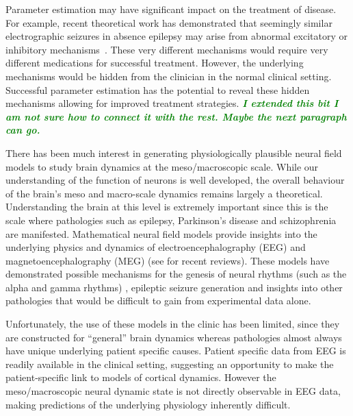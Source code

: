 \documentclass[twocolumn,11pt,a4paper]{article}		%
\newcommand{\omg}[1]{\textsf{\emph{\textbf{\textcolor{green}{#1}}}}}
\begin{document}
Parameter estimation may have significant impact on the treatment of disease. For example, recent theoretical work has demonstrated that seemingly similar electrographic seizures in absence epilepsy may arise from abnormal excitatory or inhibitory mechanisms~\cite{marten2009derivation}. These very different mechanisms would require very different medications for successful treatment. However, the underlying mechanisms would be hidden from the clinician in the normal clinical setting. Successful parameter estimation has the potential to reveal these hidden mechanisms allowing for improved treatment strategies. \omg{I extended this bit I am not sure how to connect it with the rest. Maybe the next paragraph can go.} 
% 

There has been much interest in generating physiologically plausible neural field models to study brain dynamics at the meso/macroscopic scale. While our understanding of the function of neurons is well developed, the overall behaviour of the brain's meso and macro-scale dynamics remains largely a theoretical. Understanding the brain at this level is extremely important since this is the scale where pathologies such as epilepsy, Parkinson's disease and schizophrenia are manifested. Mathematical neural field models provide insights into the underlying physics and dynamics of electroencephalography (EEG) and magnetoencephalography (MEG) (see \cite{Deco2008,David2003} for recent reviews). These models have demonstrated possible mechanisms for the genesis of neural rhythms (such as the alpha and gamma rhythms) \cite{Liley1999,RENNIE2000}, epileptic seizure generation \cite{DaSilva2003,Suffczynski2004,Wendling2005} and insights into other pathologies \cite{Moran2008,Schiff2009} that would be difficult to gain from experimental data alone. 

Unfortunately, the use of these models in the clinic has been limited, since they are constructed for ``general'' brain dynamics whereas pathologies almost always have unique underlying patient specific causes. Patient specific data from EEG is readily available in the clinical setting, suggesting an opportunity to make the patient-specific link to models of cortical dynamics. However the meso/macroscopic neural dynamic state is not directly observable in EEG data, making predictions of the underlying physiology inherently difficult.
\end{document}
